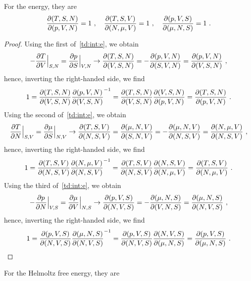     For the energy, they are 
    \begin{equation*}
        \frac{\partial(T, S, N)}{\partial(p, V, N)} = 1 ~, \quad \frac{\partial(T, S, V)}{\partial(N, \mu, V)} = 1 ~, \quad \frac{\partial(p, V, S)}{\partial(\mu, N, S)} = 1 ~.
    \end{equation*}
    \begin{proof}
        Using the first of~\eqref{td:int:e}, we obtain
        \begin{equation*}
            - \frac{\partial T}{\partial V} \Big \vert_{S, N} = \frac{\partial p}{\partial S} \Big \vert_{V, N} \rightarrow \frac{\partial(T, S, N)}{\partial(V, S, N)} = - \frac{\partial(p, V, N)}{\partial(S, V, N)} = \frac{\partial(p, V, N)}{\partial(V, S, N)} ~,
        \end{equation*} 
        hence, inverting the right-handed side, we find
        \begin{equation*}
            1 = \frac{\partial(T, S, N)}{\partial(V, S, N)} \frac{\partial(p, V, N)}{\partial(V, S, N)}^{-1} = \frac{\partial(T, S, N)}{\partial(V, S, N)} \frac{\partial(V, S, N)}{\partial(p, V, N)} = \frac{\partial(T, S, N)}{\partial(p, V, N)} ~.
        \end{equation*} 
        Using the second of~\eqref{td:int:e}, we obtain
        \begin{equation*}
            \frac{\partial T}{\partial N} \Big \vert_{S, V} = \frac{\partial\mu}{\partial S} \Big \vert_{N, V} \rightarrow \frac{\partial(T, S, V)}{\partial(N, S, V)} = \frac{\partial(\mu, N, V)}{\partial(S, N, V)} = - \frac{\partial(\mu, N, V)}{\partial(N, S, V)} = \frac{\partial(N, \mu, V)}{\partial(N, S, V)} ~,
        \end{equation*} 
        hence, inverting the right-handed side, we find
        \begin{equation*}
            1 = \frac{\partial(T, S, V)}{\partial(N, S, V)} \frac{\partial(N, \mu, V)}{\partial(N, S, V)}^{-1} = \frac{\partial(T, S, V)}{\partial(N, S, V)} \frac{\partial(N, S, V)}{\partial(N, \mu, V)} = \frac{\partial(T, S, V)}{\partial(N, \mu, V)} ~.
        \end{equation*} 
        Using the third of~\eqref{td:int:e}, we obtain
        \begin{equation*}
            - \frac{\partial p}{\partial N} \Big \vert_{V, S} = \frac{\partial\mu}{\partial V} \Big \vert_{N, S} \rightarrow \frac{\partial(p, V, S)}{\partial(N, V, S)} = - \frac{\partial(\mu, N, S)}{\partial(V, N ,S)} = \frac{\partial(\mu, N, S)}{\partial(N, V ,S)} ~,
        \end{equation*} 
        hence, inverting the right-handed side, we find
        \begin{equation*}
            1 = \frac{\partial(p, V, S)}{\partial(N, V, S)} \frac{\partial(\mu, N, S)}{\partial(N, V ,S)}^{-1} = \frac{\partial(p, V, S)}{\partial(N, V, S)} \frac{\partial(N, V ,S)}{\partial(\mu, N, S)} = \frac{\partial(p, V, S)}{\partial(\mu, N, S)} ~.
        \end{equation*} 
    \end{proof}
    For the Helmoltz free energy, they are 
